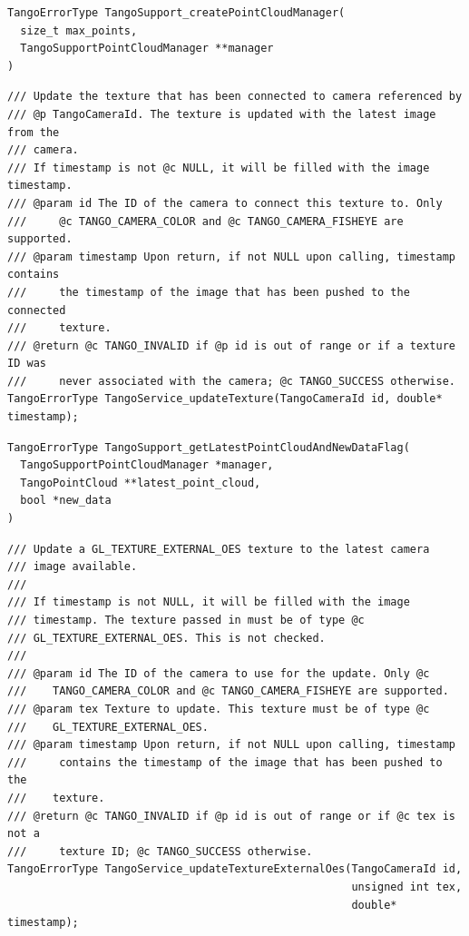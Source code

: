 \documentclass[12pt,twoside]{article}
\begin{document}
\begin{lstlisting}
TangoErrorType TangoSupport_createPointCloudManager(
  size_t max_points,
  TangoSupportPointCloudManager **manager
)
\end{lstlisting}


\begin{lstlisting}
/// Update the texture that has been connected to camera referenced by
/// @p TangoCameraId. The texture is updated with the latest image from the
/// camera.
/// If timestamp is not @c NULL, it will be filled with the image timestamp.
/// @param id The ID of the camera to connect this texture to. Only
///     @c TANGO_CAMERA_COLOR and @c TANGO_CAMERA_FISHEYE are supported.
/// @param timestamp Upon return, if not NULL upon calling, timestamp contains
///     the timestamp of the image that has been pushed to the connected
///     texture.
/// @return @c TANGO_INVALID if @p id is out of range or if a texture ID was
///     never associated with the camera; @c TANGO_SUCCESS otherwise.
TangoErrorType TangoService_updateTexture(TangoCameraId id, double* timestamp);
\end{lstlisting}


\begin{lstlisting}
TangoErrorType TangoSupport_getLatestPointCloudAndNewDataFlag(
  TangoSupportPointCloudManager *manager,
  TangoPointCloud **latest_point_cloud,
  bool *new_data
)
\end{lstlisting}


\begin{lstlisting}
/// Update a GL_TEXTURE_EXTERNAL_OES texture to the latest camera
/// image available.
///
/// If timestamp is not NULL, it will be filled with the image
/// timestamp. The texture passed in must be of type @c
/// GL_TEXTURE_EXTERNAL_OES. This is not checked.
///
/// @param id The ID of the camera to use for the update. Only @c
///    TANGO_CAMERA_COLOR and @c TANGO_CAMERA_FISHEYE are supported.
/// @param tex Texture to update. This texture must be of type @c
///    GL_TEXTURE_EXTERNAL_OES.
/// @param timestamp Upon return, if not NULL upon calling, timestamp
///     contains the timestamp of the image that has been pushed to the
///    texture.
/// @return @c TANGO_INVALID if @p id is out of range or if @c tex is not a
///     texture ID; @c TANGO_SUCCESS otherwise.
TangoErrorType TangoService_updateTextureExternalOes(TangoCameraId id,
                                                     unsigned int tex,
                                                     double* timestamp);
\end{lstlisting}
\end{document}
